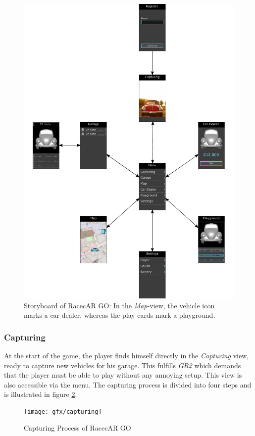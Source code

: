 \begin{figure}[btph]
  \centering
        \includegraphics[width=.8\linewidth]{gfx/storyboard}
        \caption{Storyboard of RacecAR GO: In the \emph{Map}-view, the vehicle icon marks a car dealer, whereas the play cards mark a playground.}
        \label{fig:storyboard}
\end{figure}

\subsubsection{Capturing}
At the start of the game, the player finds himself directly in the \emph{Capturing} view, ready to capture new vehicles for his garage. This fulfills \emph{GR2} which demands that the player must be able to play without any annoying setup. This view is also accessible via the menu. The capturing process is divided into four steps and is illustrated in figure \ref{fig:capturing}.

\begin{figure}[btph]
  \centering
        \texttt{[image: gfx/capturing]}
        \caption{Capturing Process of RacecAR GO}
        \label{fig:capturing}
\end{figure}

